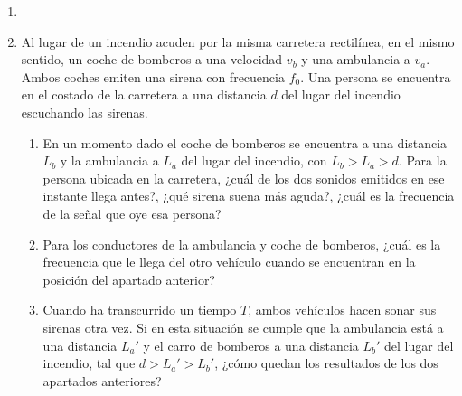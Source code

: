 \documentclass[letterpaper,11pt]{article}
\begin{document}
\vspace{-1cm}
\begin{enumerate}\setlength{\itemsep}{0.4cm}

\item[]

\item Al lugar de un incendio acuden por la misma carretera rectilínea, en el mismo sentido, un coche de bomberos a una velocidad $v_b$ y una ambulancia a $v_a$. Ambos coches emiten una sirena con frecuencia $f_0$. Una persona se encuentra en el costado de la carretera a una distancia $d$ del lugar del incendio escuchando las sirenas.

\begin{enumerate}
    \item En un momento dado el coche de bomberos se encuentra a una distancia $L_b$ y la ambulancia a $L_a$ del lugar del incendio, con $L_b > L_a > d$. Para la persona ubicada en la carretera, ¿cuál de los dos sonidos emitidos en ese instante llega antes?, ¿qué sirena suena más aguda?, ¿cuál es la frecuencia de la señal que oye esa persona?

    \item Para los conductores de la ambulancia y coche de bomberos, ¿cuál es la frecuencia que le llega del otro vehículo cuando se encuentran en la posición del apartado anterior?

    \item Cuando ha transcurrido un tiempo $T$, ambos vehículos hacen sonar sus sirenas otra vez. Si en esta situación se cumple que la ambulancia está a una distancia $L_a'$ y el carro de bomberos a una distancia $L_b'$ del lugar del incendio, tal que $d>L_a'> L_b'$, ¿cómo quedan los resultados de los dos apartados anteriores?
\end{enumerate}


\end{enumerate}
\end{document}
